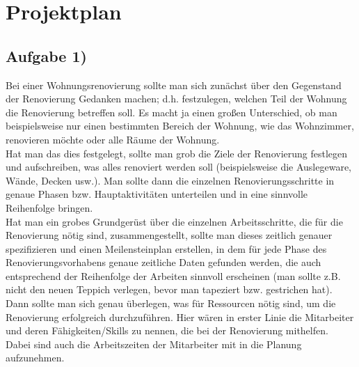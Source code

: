 \documentclass{swp1}
\begin{document}
          {}{}{}

\section*{Projektplan}          
\subsection*{Aufgabe 1)}
Bei einer Wohnungsrenovierung sollte man sich zunächst über den Gegenstand der Renovierung Gedanken machen; d.h. festzulegen, welchen Teil der Wohnung die Renovierung betreffen soll. Es macht ja einen großen Unterschied, ob man beispielsweise nur einen bestimmten Bereich der Wohnung, wie das Wohnzimmer, renovieren möchte oder alle Räume der Wohnung. \\
Hat man das dies festgelegt, sollte man grob die Ziele der Renovierung festlegen und aufschreiben, was alles renoviert werden soll (beispielsweise die Auslegeware, Wände, Decken usw.).
Man sollte dann die einzelnen Renovierungsschritte in genaue Phasen bzw. Hauptaktivitäten unterteilen und in eine sinnvolle Reihenfolge bringen.\\
Hat man ein grobes Grundgerüst über die einzelnen Arbeitsschritte, die für die Renovierung nötig sind, zusammengestellt, sollte man dieses zeitlich genauer spezifizieren und einen Meilensteinplan erstellen, in dem für jede Phase des Renovierungsvorhabens genaue zeitliche Daten gefunden werden, die auch entsprechend der Reihenfolge der Arbeiten sinnvoll erscheinen (man sollte z.B. nicht den neuen Teppich verlegen, bevor man tapeziert bzw. gestrichen hat). \\

Dann sollte man sich genau überlegen, was für Ressourcen nötig sind, um die Renovierung erfolgreich durchzuführen. Hier wären in erster Linie die Mitarbeiter und deren Fähigkeiten/Skills zu nennen, die bei der Renovierung mithelfen. Dabei sind auch die Arbeitszeiten der Mitarbeiter mit in die Planung aufzunehmen. \\
\end{document}
